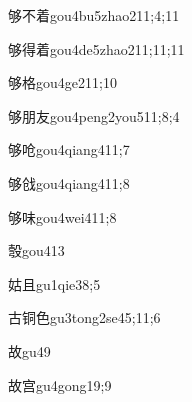 \begin{verbete}{够不着}{gou4bu5zhao2}{11;4;11}
\end{verbete}

\begin{verbete}{够得着}{gou4de5zhao2}{11;11;11}
\end{verbete}

\begin{verbete}{够格}{gou4ge2}{11;10}
\end{verbete}

\begin{verbete}{够朋友}{gou4peng2you5}{11;8;4}
\end{verbete}

\begin{verbete}{够呛}{gou4qiang4}{11;7}
\end{verbete}

\begin{verbete}{够戗}{gou4qiang4}{11;8}
\end{verbete}

\begin{verbete}{够味}{gou4wei4}{11;8}
\end{verbete}

\begin{verbete}{彀}{gou4}{13}
\end{verbete}

\begin{verbete}{姑且}{gu1qie3}{8;5}
\end{verbete}

\begin{verbete}{古铜色}{gu3tong2se4}{5;11;6}
\end{verbete}

\begin{verbete}{故}{gu4}{9}
\end{verbete}

\begin{verbete}{故宫}{gu4gong1}{9;9}
\end{verbete}


